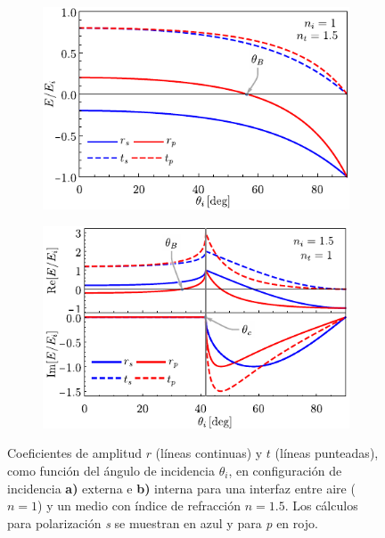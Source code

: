 \begin{figure}[h!]\centering\hspace*{-1.5em}
	\begin{subfigure}{.05\textwidth}\vspace{-4.5cm}\caption{}\label{sfig:coefExt}\end{subfigure}
	\begin{subfigure}{.43\textwidth} \hspace*{-.8cm}
	\includegraphics[scale=1]{1-Teoria/figs/1-1-ampCoefExt}
	\end{subfigure}
	\begin{subfigure}{.05\textwidth}\vspace{-4.5cm}\caption{}\label{sfig:coefInt}\end{subfigure}
	\begin{subfigure}{.43\textwidth} \hspace*{-.9cm}
	\includegraphics[scale=1]{1-Teoria/figs/1-1-ampCoefInt}
	\end{subfigure}\vspace*{-.7em}
	\caption{ Coeficientes de amplitud $r$ (líneas continuas) y $t$ (líneas punteadas), como función del ángulo de incidencia $\theta_i$, en configuración de incidencia \textbf{a)} externa e \textbf{b)} interna para una interfaz entre  aire ($n=1$) y un medio con índice de refracción $n = 1.5$. Los cálculos para polarización  \emph{s} se muestran  en azul y  para \emph{p} en rojo. }	\label{fig:coefAmp}	
	\end{figure}	
%

